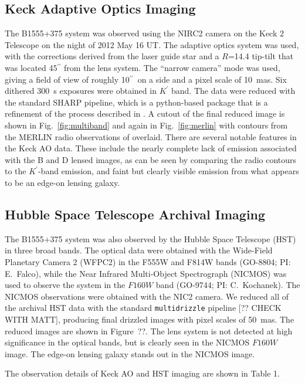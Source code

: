 \documentclass[useAMS,usenatbib]{mn2e}
\begin{document}
\subsection{Keck Adaptive Optics Imaging}

The B1555+375 system was observed using the NIRC2 camera on the Keck 2
Telescope on the night of 2012 May 16 UT.  The adaptive optics system
was used, with the corrections derived from the laser guide star and a
$R$=14.4 tip-tilt that was located 45$^{\prime\prime}$ from the lens
system.  The ``narrow camera'' mode was used, giving a field of view
of roughly 10$^{\prime\prime}$\ on a side and a pixel scale of 10~mas.
Six dithered 300~s exposures were obtained in $K^{\prime}$ band.  The
data were reduced with the standard SHARP pipeline, which is a
python-based package that is a refinement of the process described in
\citet{Auger_EELS1}.  A cutout of the final reduced image is shown in
Fig.~\ref{fig:multiband} and again in Fig.~\ref{fig:merlin} with
contours from the MERLIN radio observations of \citet{Marlow}
overlaid.  There are several notable features in the Keck AO data.
These include the nearly complete lack of emission associated with the
B and D lensed images, as can be seen by comparing the radio contours
to the $K^\prime$-band emission, and faint but clearly visible
emission from what appears to be an edge-on lensing galaxy.

\subsection{Hubble Space Telescope Archival Imaging}

The B1555+375 system was also observed by the Hubble Space Telescope
(HST) in three broad bands.  The optical data were obtained with the
Wide-Field Planetary Camera 2 (WFPC2) in the F555W and F814W bands
(GO-8804; PI: E.\ Falco), while the Near Infrared Multi-Object
Spectrograph (NICMOS) was used to observe the system in the $F160W$
band (GO-9744; PI: C.\ Kochanek).  The NICMOS observations were
obtained with the NIC2 camera.  We reduced all of the archival HST
data with the standard {\tt multidrizzle} pipeline [?? CHECK WITH
MATT], producing final drizzled images with pixel scales of
50~mas.  The reduced images are shown in Figure~??.  The lens system
is not detected at high significance in the optical bands, but is
clearly seen in the NICMOS $F160W$ image.  The edge-on lensing galaxy 
stands out in the NICMOS image.

The observation details of Keck AO and HST imaging are shown in Table 1.
\end{document}
